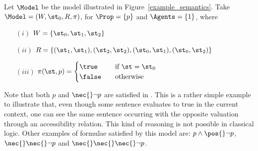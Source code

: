 \begin{example}
    Let $\Model$ be the model illustrated in Figure~\ref{example_semantics}. Take
    $\Model = (W, \st_0, R, \pi)$, for $\Prop = \{p\}$ and $\Agents = \{1\}$,
    where 
    \begin{enumerate}
        \item[$(i)$] $W = \{\st_0, \st_1, \st_2\}$
        \item[$(ii)$] $R = \{(\st_1, \st_1), (\st_2, \st_2),
            (\st_0, \st_1), (\st_0, \st_2)\}$
        \item[$(iii)$] $ \pi(\st, p) = 
            \begin{cases} 
                \true    & \quad \text{if } \st = \st_0\\
                \false   & \quad \text{otherwise}
            \end{cases}
                       $
    \end{enumerate}

    Note that both $p$ and $\nec{} \neg p$ are satisfied in \Model. This is a
    rather simple example to illustrate that, even though some sentence
    evaluates to true in the current context, one can see the same sentence
    occurring with the opposite valuation through an accessibility relation.
    This kind of reasoning is not possible in classical logic. Other examples of
    formulae satisfied by this model are: $p \land \pos{} \neg p$, $\nec{}\nec{}
    \neg p$ and $\nec{} \nec {} \nec{} \neg p$.
\end{example}



